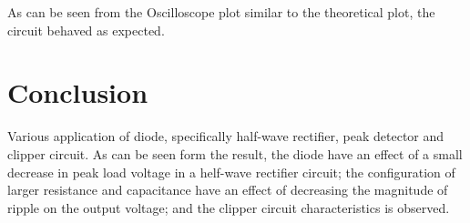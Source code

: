 \documentclass{article}
\begin{document}
As can be seen from the Oscilloscope plot similar to the theoretical plot, the circuit behaved as expected.

\section*{Conclusion}
Various application of diode, specifically half-wave rectifier, peak detector and clipper circuit. As can be seen form the result, the diode have an effect of a small decrease in peak load voltage in a helf-wave rectifier circuit; the configuration of larger resistance and capacitance have an effect of decreasing the magnitude of ripple on the output voltage; and the clipper circuit characteristics is observed.
\end{document}
